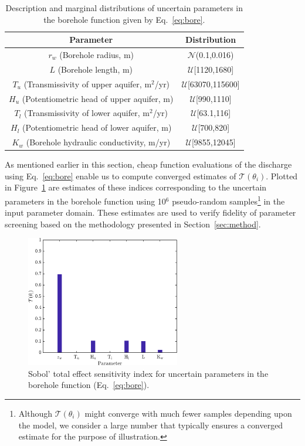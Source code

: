 \begin{table}[htbp]
\renewcommand*{\arraystretch}{1.2}
\begin{center}
\begin{tabular}{|c|c|}
\hline
Parameter & Distribution \\ \hline \hline
$r_w$ (Borehole radius, m) & $\mathcal{N}$(0.1,0.016) \\
$L$ (Borehole length, m) & $\mathcal{U}$[1120,1680] \\
$T_u$ (Transmissivity of upper aquifer, m$^2$/yr) & $\mathcal{U}$[63070,115600] \\
$H_u$ (Potentiometric head of upper aquifer, m) & $\mathcal{U}$[990,1110] \\
$T_l$ (Transmissivity of lower aquifer, m$^2$/yr) & $\mathcal{U}$[63.1,116] \\
$H_l$ (Potentiometric head of lower aquifer, m) & $\mathcal{U}$[700,820] \\
$K_w$ (Borehole hydraulic conductivity, m/yr) & $\mathcal{U}$[9855,12045] \\
\hline
\end{tabular}
\end{center}

\caption{Description and marginal distributions of uncertain parameters in the borehole function
given by Eq.~\ref{eq:bore}.}
\label{tab:bore}
\end{table}

As mentioned earlier in this section, cheap function evaluations of the discharge using 
Eq.~\ref{eq:bore} enable us to compute converged estimates of $\mathcal{T}(\theta_i)$. Plotted in
Figure~\ref{fig:sense_bore} are estimates of these indices corresponding to the uncertain
parameters in the borehole function using 10$^6$ pseudo-random
samples\footnote{Although $\mathcal{T}(\theta_i)$ 
might converge with much fewer samples depending upon the model, we consider a large number that
typically ensures a converged estimate for the purpose of illustration.} in the input parameter domain. 
These estimates are used to verify fidelity of
parameter screening based on the methodology presented in Section~\ref{sec:method}. 

\begin{figure}[htbp]
 \begin{center}
  \includegraphics[width=0.6\textwidth]{./Figures/sense_borehole}
\caption{Sobol' total effect sensitivity index for uncertain parameters in the borehole
function (Eq.~\ref{eq:bore}).}
\label{fig:sense_bore}
\end{center}
\end{figure}

